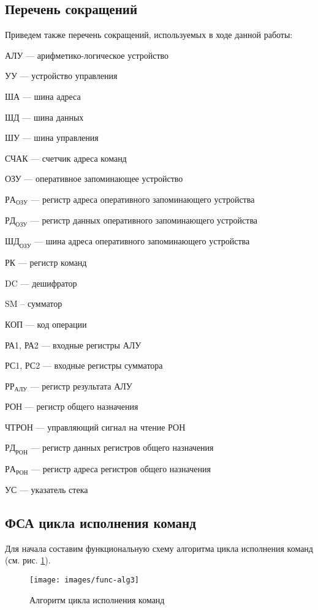 \documentclass[a4paper,14pt]{extarticle}
\begin{document}
	
	\subsection{Перечень сокращений}
	Приведем также перечень сокращений, используемых в ходе данной работы:
	
	АЛУ --- арифметико-логическое устройство
	
	УУ --- устройство управления
	
	ША --- шина адреса
	
	ШД --- шина данных
	
	ШУ --- шина управления
	
	СЧАК --- счетчик адреса команд
	
	ОЗУ  --- оперативное запоминающее устройство
	
	$РА_{ОЗУ}$ --- регистр адреса оперативного запоминающего устройства
	
	$РД_{ОЗУ}$ --- регистр данных оперативного запоминающего устройства
	
	$ШД_{ОЗУ}$ --- шина адреса оперативного запоминающего устройства
	
	РК  --- регистр команд
	
	
	DC  --- дешифратор
	
	SM -- сумматор
	
	КОП --- код операции
	
	РА1, РА2 --- входные регистры АЛУ
	
	РС1, РС2 --- входные регистры сумматора
	
	$РР_{АЛУ}$ --- регистр результата АЛУ
	
	РОН --- регистр общего назначения
	
	ЧТРОН --- управляющий сигнал на чтение РОН
	
	$РД_{РОН}$  --- регистр данных регистров общего назначения
	
	$РА_{РОН}$  --- регистр адреса регистров общего назначения
	
	УС --- указатель стека
	
	
	\subsection{ФСА цикла исполнения команд}
	
	Для начала составим функциональную схему алгоритма цикла исполнения команд (см. рис. \ref{fig:func-alg}).
	
	
	\begin{figure}[htbp]
		\centering
		\texttt{[image: images/func-alg3]}
		\caption{Алгоритм цикла исполнения команд}
		\label{fig:func-alg}
	\end{figure}
	\newpage
	
\end{document}
